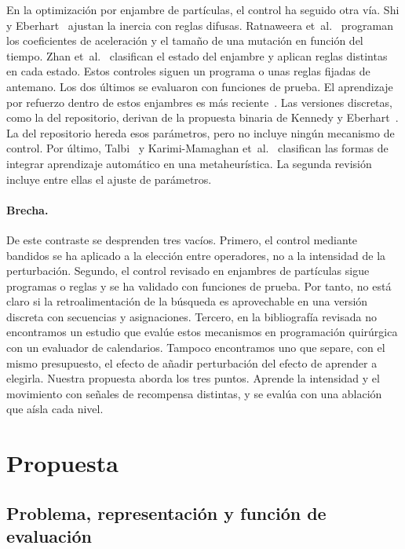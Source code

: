 \documentclass[10pt,a4paper]{article}
\begin{document}
En la optimización por enjambre de partículas, el control ha seguido otra vía. Shi y
Eberhart~\cite{shi2001} ajustan la inercia con reglas difusas. Ratnaweera
et~al.~\cite{ratnaweera2004} programan los coeficientes de aceleración y el tamaño de una
mutación en función del tiempo. Zhan et~al.~\cite{zhan2009} clasifican el estado del enjambre
y aplican reglas distintas en cada estado. Estos controles siguen un programa o unas
reglas fijadas de antemano. Los dos últimos se evaluaron con funciones de prueba. El aprendizaje por refuerzo dentro
de estos enjambres es más reciente~\cite{samma2016}. Las versiones discretas, como la del
repositorio, derivan de la propuesta binaria de Kennedy y Eberhart~\cite{kennedy1997}. La del
repositorio hereda esos parámetros, pero no incluye ningún mecanismo de control. Por último, Talbi~\cite{talbi2021} y Karimi-Mamaghan et~al.~\cite{karimi2022} clasifican las
formas de integrar aprendizaje automático en una metaheurística. La segunda revisión incluye
entre ellas el ajuste de parámetros.

\paragraph{Brecha.}
De este contraste se desprenden tres vacíos. Primero, el control mediante bandidos se ha
aplicado a la elección entre operadores, no a la intensidad de la perturbación. Segundo, el
control revisado en enjambres de partículas sigue programas o reglas y se ha validado con
funciones de prueba. Por tanto, no está claro si la
retroalimentación de la búsqueda es aprovechable en una versión discreta con secuencias y
asignaciones. Tercero, en la bibliografía revisada no encontramos un estudio que evalúe estos
mecanismos en programación quirúrgica con un evaluador de calendarios. Tampoco encontramos uno
que separe, con el mismo presupuesto, el efecto de añadir perturbación del efecto de aprender a
elegirla. Nuestra propuesta aborda los tres puntos. Aprende la intensidad y el movimiento con
señales de recompensa distintas, y se evalúa con una ablación que aísla cada nivel.

\section{Propuesta}

\subsection{Problema, representación y función de evaluación}
\label{sec:prob}
\end{document}
